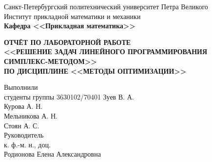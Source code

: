 \documentclass[main.tex]{subfiles}
\begin{document}
\begin{titlepage}
\begin{center}
	\begin{large}
		Санкт-Петербургский политехнический университет Петра Великого\\
		Институт прикладной математики и механики\\
		\textbf{Кафедра <<Прикладная математика>>}\\
	\end{large}
	\vfill
	\Large{\textbf{ОТЧЁТ ПО ЛАБОРАТОРНОЙ РАБОТЕ\\
	<<РЕШЕНИЕ ЗАДАЧ ЛИНЕЙНОГО ПРОГРАММИРОВАНИЯ СИМПЛЕКС-МЕТОДОМ>>\\
	ПО ДИСЦИПЛИНЕ <<МЕТОДЫ ОПТИМИЗАЦИИ>>}}
\end{center}
\vfill
\flushleft
Выполнили\\
студенты группы 3630102/70401
\flushright
Зуев В. А.\\
Курова А. Н.\\
Мельникова А. Н.\\
Стоян А. С.\\ 
\flushleft
Руководитель\\
к. ф.-м. н., доц.\\
\flushright
Родионова Елена Александровна
\vfill
{}
\end{titlepage}
\end{document}
